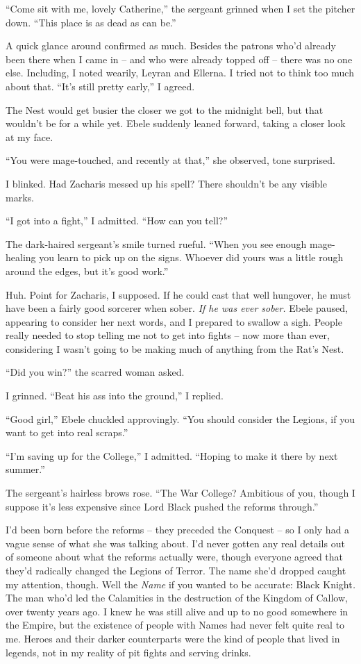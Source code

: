 \documentclass[12pt, openany]{book}
\begin{document}
“Come sit with me, lovely Catherine,” the sergeant grinned when I set the pitcher down. “This place is as dead as can be.”

A quick glance around confirmed as much. Besides the patrons who’d already been there when I came in – and who were already topped off – there was no one else. Including, I noted wearily, Leyran and Ellerna. I tried not to think too much about that. “It’s still pretty early,” I agreed. 

The Nest would get busier the closer we got to the midnight bell, but that wouldn’t be for a while yet. Ebele suddenly leaned forward, taking a closer look at my face.

“You were mage-touched, and recently at that,” she observed, tone surprised.

I blinked. Had Zacharis messed up his spell? There shouldn’t be any visible marks.

“I got into a fight,” I admitted. “How can you tell?”

The dark-haired sergeant’s smile turned rueful. “When you see enough mage-healing you learn to pick up on the signs. Whoever did yours was a little rough around the edges, but it’s good work.”

Huh. Point for Zacharis, I supposed. If he could cast that well hungover, he must have been a fairly good sorcerer when sober. \textit{If he was ever sober.} Ebele paused, appearing to consider her next words, and I prepared to swallow a sigh. People really needed to stop telling me not to get into fights – now more than ever, considering I wasn’t going to be making much of anything from the Rat’s Nest.

“Did you win?” the scarred woman asked.

I grinned. “Beat his ass into the ground,” I replied.

“Good girl,” Ebele chuckled approvingly. “You should consider the Legions, if you want to get into real scraps.”

“I’m saving up for the College,” I admitted. “Hoping to make it there by next summer.”

The sergeant’s hairless brows rose. “The War College? Ambitious of you, though I suppose it’s less expensive since Lord Black pushed the reforms through.”

I’d been born before the reforms – they preceded the Conquest – so I only had a vague sense of what she was talking about. I’d never gotten any real details out of someone about what the reforms actually were, though everyone agreed that they’d radically changed the Legions of Terror. The name she’d dropped caught my attention, though. Well the \textit{Name} if you wanted to be accurate:\textit{ }Black Knight\textit{.} The man who’d led the Calamities in the destruction of the Kingdom of Callow, over twenty years ago. I knew he was still alive and up to no good somewhere in the Empire, but the existence of people with Names had never felt quite real to me. Heroes and their darker counterparts were the kind of people that lived in legends, not in my reality of pit fights and serving drinks.
\end{document}
